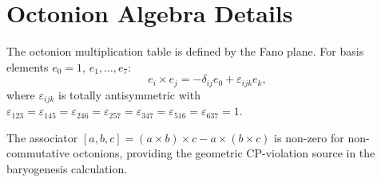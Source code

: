\documentclass[12pt,a4paper]{article}
\begin{document}
\section{Octonion Algebra Details}

The octonion multiplication table is defined by the Fano plane. For basis elements $e_0 = 1$, $e_1, \ldots, e_7$:
\[
e_i \times e_j = -\delta_{ij}e_0 + \varepsilon_{ijk} e_k,
\]
where $\varepsilon_{ijk}$ is totally antisymmetric with $\varepsilon_{123} = \varepsilon_{145} = \varepsilon_{246} = \varepsilon_{257} = \varepsilon_{347} = \varepsilon_{516} = \varepsilon_{637} = 1$.

The associator $[a,b,c] = (a \times b) \times c - a \times (b \times c)$ is non-zero for non-commutative octonions, providing the geometric CP-violation source in the baryogenesis calculation.
\end{document}
